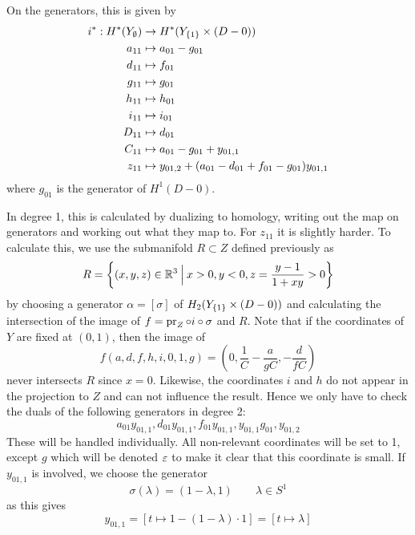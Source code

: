 On the generators, this is given by
\begin{align*}
  i^* : H^*(Y_{\emptyset}) &\to H^*(Y_{\left\{ 1 \right\}}\times (D-0)) \\
  a_{11} & \mapsto a_{01} - g_{01} \\
  d_{11} &\mapsto f_{01} \\
  g_{11} &\mapsto g_{01} \\
  h_{11} &\mapsto h_{01} \\
  i_{11} &\mapsto i_{01} \\
  D_{11} &\mapsto d_{01} \\
  C_{11} &\mapsto a_{01} - g_{01} + y_{01,1} \\
  z_{11} &\mapsto y_{01,2} + (a_{01}-d_{01}+f_{01}-g_{01})y_{01,1}
\end{align*}
where $g_{01}$ is the generator of $H^1(D-0)$.

In degree 1, this is calculated by dualizing to homology, writing out
the map on generators and working
out what they map to. For $z_{11}$ it is slightly
harder. To calculate this, we use the submanifold $R \subset Z$
defined previously as
\[ R = \left\{ (x,y,z)\in \mathbb{R}^3 \: \Big\vert\: x > 0, y < 0, z =
  \frac{y-1}{1+xy}>0 \right\} \]
by choosing a generator $\alpha = [\sigma]$ of $H_2(Y_{\left\{ 1 \right\}}\times
(D-0))$ and calculating the intersection of the image of $f = \operatorname{pr}_Z
\circ i\circ \sigma$ and $R$. Note that if the coordinates of $Y$ are
fixed at $(0,1)$, then the image of
\[ f(a,d,f,h,i,0,1,g) =
\left(0,\frac{1}{C}-\frac{a}{gC},-\frac{d}{fC} \right)\]
never intersects $R$ since $x = 0$. Likewise, the coordinates $i$ and
$h$ do not appear in the projection to $Z$ and can not influence the
result. Hence we only have to check the duals of the following
generators in degree 2:
\[ a_{01} y_{01,1}, d_{01} y_{01,1}, f_{01} y_{01,1}, y_{01,1} g_{01},
y_{01,2} \]
These will be handled individually. All non-relevant coordinates will
be set to 1, except $g$ which will be denoted $\varepsilon$ to make it clear
that this coordinate is small. If $y_{01,1}$ is involved, we choose the
generator
\[ \sigma(\lambda) = (1-\lambda,1) \qquad \lambda\in S^1 \]
as this gives
\[ y_{01,1} = [t \mapsto 1-(1-\lambda)\cdot 1] = [t\mapsto \lambda] \]

